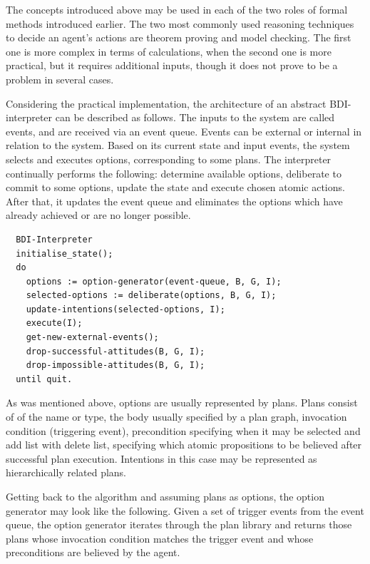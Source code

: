The concepts introduced above may be used in each of the two roles of formal methods introduced earlier.
The two most commonly used reasoning techniques to decide an agent's actions are theorem proving and model checking.
The first one is more complex in terms of calculations, when the second one is more practical, but it requires additional inputs, though it does not prove to be a problem in several cases.

Considering the practical implementation, the architecture of an abstract BDI-interpreter can be described as follows.
The inputs to the system are called events, and are received via an event queue.
Events can be external or internal in relation to the system.
Based on its current state and input events, the system selects and executes options, corresponding to some plans.
The interpreter continually performs the following: determine available options, deliberate to commit to some options, update the state and execute chosen atomic actions.
After that, it updates the event queue and eliminates the options which have already achieved or are no longer possible.

\begin{lstlisting}
  BDI-Interpreter
  initialise_state();
  do
    options := option-generator(event-queue, B, G, I);
    selected-options := deliberate(options, B, G, I);
    update-intentions(selected-options, I);
    execute(I);
    get-new-external-events();
    drop-successful-attitudes(B, G, I);
    drop-impossible-attitudes(B, G, I);
  until quit.
\end{lstlisting}

As was mentioned above, options are usually represented by plans.
Plans consist of of the name or type, the body usually specified by a plan graph, invocation condition (triggering event), precondition specifying when it may be selected and add list with delete list, specifying which atomic propositions to be believed after successful plan execution.
Intentions in this case may be represented as hierarchically related plans.

Getting back to the algorithm and assuming plans as options, the option generator may look like the following.
Given a set of trigger events from the event queue, the option generator iterates through the plan library and returns those plans whose invocation condition matches the trigger event and whose preconditions are believed by the agent.

